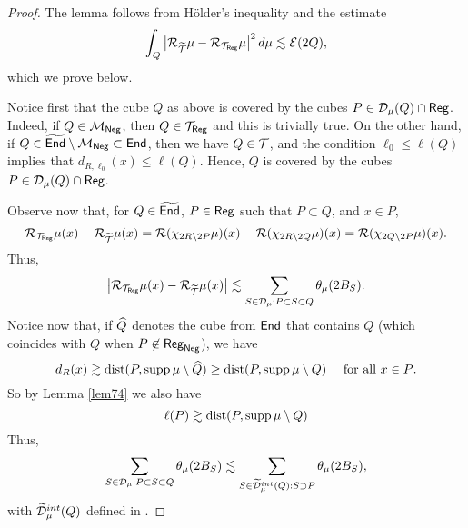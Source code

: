 \begin{proof}
The lemma follows from H\"older's inequality and the estimate
\begin{equation}\label{eqf932}
\int_Q \big|{\mathcal R}_{{\widetilde{{\mathcal T}}}}\mu - {\mathcal R}_{{\mathcal T}_{\mathsf{Reg}}}\mu\big|^2\,d\mu \lesssim {\mathcal E}(2Q),
\end{equation}
which we prove below.

Notice first that the cube $Q$ as above is covered by the cubes $P\in{\mathcal D}_{\mu}(Q)\cap{\mathsf{Reg}}$. Indeed, if $Q\in {\mathcal M}_{\mathsf{Neg}}$, then $Q\in{\mathcal T}_{{\mathsf{Reg}}}$ and this is trivially true. On the other hand, if $Q\in{\widetilde{{\mathsf{End}}}}\setminus{\mathcal M}_{\mathsf{Neg}}\subset{\mathsf{End}}$, then we have $Q\in{\mathcal T}$, and the condition $\ell_0\leq \ell(Q)$ implies that $d_{R,\ell_0}(x)\leq\ell(Q)$. Hence, 
$Q$ is covered by the cubes $P\in{\mathcal D}_\mu(Q)\cap{\mathsf{Reg}}$.

Observe now that, for $Q\in{\widetilde{{\mathsf{End}}}}$, $P\in{\mathsf{Reg}}$ such that $P\subset Q$, and $x\in P$,
$${\mathcal R}_{{\mathcal T}_{\mathsf{Reg}}}\mu(x) - {\mathcal R}_{{\widetilde{{\mathcal T}}}}\mu(x) = {\mathcal R}(\chi_{2R\setminus 2P}\mu)(x) -
{\mathcal R}(\chi_{2R\setminus 2Q}\mu)(x) = {\mathcal R}(\chi_{2Q\setminus 2P}\mu)(x).$$
Thus,
$$\big|{\mathcal R}_{{\mathcal T}_{\mathsf{Reg}}}\mu(x) - {\mathcal R}_{{\widetilde{{\mathcal T}}}}\mu(x)\big| \lesssim \sum_{S\in{\mathcal D}_\mu:P\subset S\subset Q}
\theta_\mu(2B_S).$$
Notice now that, if ${\widehat{Q}}$ denotes the cube from ${\mathsf{End}}$ that contains $Q$ (which coincides with
$Q$ when $P\not\in{\mathsf{Reg}}_{\mathsf{Neg}}$), we have
$$d_R(x) \gtrsim {\rm dist}(P,\operatorname{supp}\mu\setminus {\widehat{Q}}) \geq {\rm dist}(P,\operatorname{supp}\mu\setminus Q) 
\quad \mbox{ for all $x\in P$.}$$
So by Lemma \ref{lem74} we also have
\begin{equation}\label{eqreg71}
\ell(P) \gtrsim {\rm dist}(P,\operatorname{supp}\mu\setminus Q)
\end{equation}
Thus,
$$\sum_{S\in{\mathcal D}_\mu:P\subset S\subset Q}
\theta_\mu(2B_S) \lesssim \sum_{S\in{\widetilde{{\mathcal D}}}_\mu^{int}(Q):S\supset P}
\theta_\mu(2B_S),$$
with ${\widetilde{{\mathcal D}}}_\mu^{int}(Q)$ defined in .


\end{proof}

